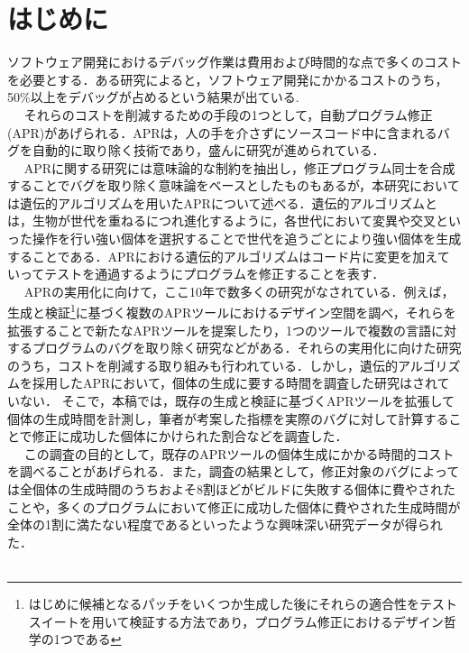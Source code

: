 \documentclass[uplatex,dvipdfmx,a4paper]{jsarticle}
\let\oldcite\cite
\renewcommand{\cite}[1]{\xspace\oldcite{#1}}
\begin{document}
\section{はじめに}\label{sec:intro}
ソフトウェア開発におけるデバッグ作業は費用および時間的な点で多くのコストを必要とする．ある研究によると，ソフトウェア開発にかかるコストのうち，50\%以上をデバッグが占めるという結果が出ている\cite{5386906, Britton_reversibledebugging}.\\　
それらのコストを削減するための手段の1つとして，自動プログラム修正(APR)があげられる．APRは，人の手を介さずにソースコード中に含まれるバグを自動的に取り除く技術であり，盛んに研究が進められている\cite{gazzola2018automatic, goues2019automated}．\\　
APRに関する研究には意味論的な制約を抽出し，修正プログラム同士を合成することでバグを取り除く意味論をベースとしたものもある\cite{le2018overfitting}が，本研究においては遺伝的アルゴリズムを用いたAPRについて述べる．遺伝的アルゴリズムとは，生物が世代を重ねるにつれ進化するように，各世代において変異や交叉といった操作を行い強い個体を選択することで世代を追うごとにより強い個体を生成することである．APRにおける遺伝的アルゴリズムはコード片に変更を加えていってテストを通過するようにプログラムを修正することを表す．\\　
APRの実用化に向けて，ここ10年で数多くの研究がなされている．例えば，生成と検証\footnote{はじめに候補となるパッチをいくつか生成した後にそれらの適合性をテストスイートを用いて検証する方法であり，プログラム修正におけるデザイン哲学の1つである\cite{martinez2019astor}}に基づく複数のAPRツールにおけるデザイン空間を調べ，それらを拡張することで新たなAPRツールを提案したり\cite{martinez2019astor}，1つのツールで複数の言語に対するプログラムのバグを取り除く研究\cite{lin2017quixbugs}などがある．それらの実用化に向けた研究のうち，コストを削減する取り組みも行われている\cite{id692,qi2013efficient}．しかし，遺伝的アルゴリズムを採用したAPRにおいて，個体の生成に要する時間を調査した研究はされていない．
そこで，本稿では，既存の生成と検証に基づくAPRツールを拡張して個体の生成時間を計測し，筆者が考案した指標を実際のバグに対して計算することで修正に成功した個体にかけられた割合などを調査した．\\　
この調査の目的として，既存のAPRツールの個体生成にかかる時間的コストを調べることがあげられる．また，調査の結果として，修正対象のバグによっては全個体の生成時間のうちおよそ8割ほどがビルドに失敗する個体に費やされたことや，多くのプログラムにおいて修正に成功した個体に費やされた生成時間が全体の1割に満たない程度であるといったような興味深い研究データが得られた．\\　
\end{document}
